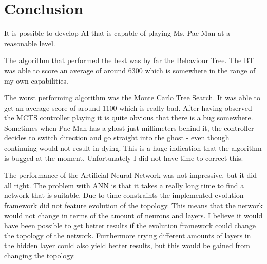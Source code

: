 
\section{Conclusion}
It is possible to develop AI that is capable of playing Ms. Pac-Man at a reasonable level.

The algorithm that performed the best was by far the Behaviour Tree. The BT was able to score an average of around 6300 which is somewhere in the range of my own capabilities.

The worst performing algorithm was the Monte Carlo Tree Search. It was able to get an average score of around 1100 which is really bad. After having observed the MCTS controller playing it is quite obvious that there is a bug somewhere. Sometimes when Pac-Man has a ghost just millimeters behind it, the controller decides to switch direction and go straight into the ghost - even though continuing would not result in dying. This is a huge indication that the algorithm is bugged at the moment. Unfortunately I did not have time to correct this.

The performance of the Artificial Neural Network was not impressive, but it did all right. The problem with ANN is that it takes a really long time to find a network that is suitable. Due to time constraints the implemented evolution framework did not feature evolution of the topology. This means that the network would not change in terms of the amount of neurons and layers. I believe it would have been possible to get better results if the evolution framework could change the topology of the network. Furthermore trying different amounts of layers in the hidden layer could also yield better results, but this would be gained from changing the topology.